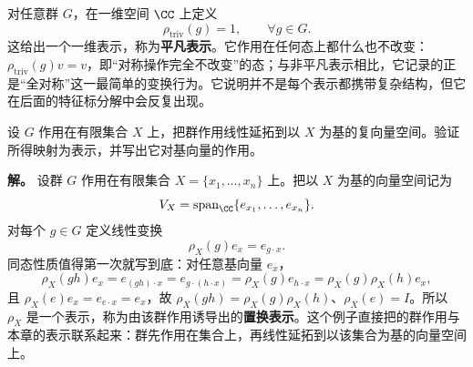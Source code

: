 对任意群 $G$，在一维空间 $\CC$ 上定义
\[
\rho_{\mathrm{triv}}(g)=1,
\qquad \forall g\in G.
\]
这给出一个一维表示，称为\textbf{平凡表示}。它作用在任何态上都什么也不改变：$\rho_{\mathrm{triv}}(g)v=v$，即“对称操作完全不改变”的态；与非平凡表示相比，它记录的正是“全对称”这一最简单的变换行为。它说明并不是每个表示都携带复杂结构，但它在后面的特征标分解中会反复出现。


\begin{example}[{由群作用诱导的置换表示}]
设 $G$ 作用在有限集合 $X$ 上，把群作用线性延拓到以 $X$ 为基的复向量空间。验证所得映射为表示，并写出它对基向量的作用。

\textbf{解。} 设群 $G$ 作用在有限集合 $X=\{x_1,\dots,x_n\}$ 上。把以 $X$ 为基的向量空间记为
\[
V_X=\operatorname{span}_{\CC}\{e_{x_1},\dots,e_{x_n}\}.
\]
对每个 $g\in G$ 定义线性变换
\[
\rho_X(g)e_x=e_{g\cdot x}.
\]
同态性质值得第一次就写到底：对任意基向量 $e_x$，
\[
\rho_X(gh)e_x=e_{(gh)\cdot x}=e_{g\cdot(h\cdot x)}=\rho_X(g)e_{h\cdot x}=\rho_X(g)\rho_X(h)e_x,
\]
且 $\rho_X(e)e_x=e_{e\cdot x}=e_x$，故 $\rho_X(gh)=\rho_X(g)\rho_X(h)$、$\rho_X(e)=I$。所以 $\rho_X$ 是一个表示，称为由该群作用诱导出的\textbf{置换表示}。这个例子直接把的群作用与本章的表示联系起来：群先作用在集合上，再线性延拓到以该集合为基的向量空间上。
\label{ex:permutation-representation}
\end{example}

